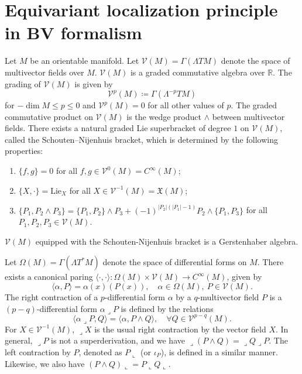 \documentclass[12pt]{amsart}
\numberwithin{table}{section}
\numberwithin{equation}{section}
\theoremstyle{plain}
\newcommand{\R}{\mathbb{R}}
\newcommand{\MV}{\mathcal{V}}
\begin{document}
\section{Equivariant localization principle in BV formalism}


Let $M$ be an orientable manifold. Let $\MV(M)=\Gamma(\Lambda TM)$ denote the space of multivector fields over $M$. $\MV(M)$ is a graded commutative algebra over $\R$. The grading of $\MV(M)$ is given by  
\[
\MV^{p}(M)\coloneqq \Gamma(\Lambda^{-p} TM)
\] 
for $-\dim M \leq p \leq 0$ and $\MV^{p}(M)=0$ for all other values of $p$. The graded commutative product on $\MV(M)$ is the wedge product $\wedge$ between multivector fields.
There exists a natural graded Lie superbracket of degree $1$ on $\MV(M)$, called the Schouten--Nijenhuis bracket, which is determined by the following properties:
\begin{enumerate}
	\item $\{f,g\}=0$ for all $f, g \in \MV^0(M)=C^{\infty}(M)$;
	\item $\{X, \cdot\}=\mathrm{Lie}_X$ for all $X \in \MV^{-1}(M)=\mathfrak{X}(M)$;
	\item $\{P_1, P_2 \wedge P_3\} = \{P_1,P_2\} \wedge P_3 + (-1)^{|P_2|(|P_1|-1)}P_2 \wedge \{P_1,P_3\}$ for all $P_1, P_2, P_3 \in \MV(M)$.
\end{enumerate}
$\MV(M)$ equipped with the Schouten-Nijenhuis bracket is a Gerstenhaber algebra. 

Let $\Omega(M)=\Gamma(\Lambda T^*M)$ denote the space of differential forms on $M$. There exists a canonical paring $\langle \cdot, \cdot \rangle\colon \Omega(M) \times \MV(M) \rightarrow C^{\infty}(M)$, given by
\[
\langle \alpha, P \rangle = \alpha(x)(P(x)), \quad \alpha \in \Omega(M),~P \in \MV(M).
\]
The right contraction of a $p$-differential form $\alpha$ by a $q$-multivector field $P$ is a $(p-q)$-differential form $\alpha \lrcorner P$ is defined by the relations
\[
\langle \alpha \lrcorner P, Q \rangle = \langle \alpha, P \wedge Q \rangle, \quad \forall Q \in \MV^{p-q}(M).
\]
For $X \in \MV^{-1}(M)$, $\lrcorner X$ is the usual right contraction by the vector field $X$. In general,  $\lrcorner P$ is not a superderivation, and we have
$
\lrcorner (P \wedge Q) = \lrcorner Q \lrcorner P.
$
The left contraction by $P$, denoted as $P \llcorner $ (or $\iota_P$), is defined in a similar manner. Likewise, we also have
$
(P \wedge Q) \llcorner = P \llcorner  Q \llcorner.
$
\end{document}

